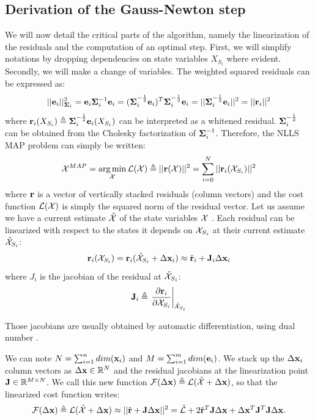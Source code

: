 \subsection{Derivation of the Gauss-Newton step}
We will now detail the critical parts of the algorithm, namely the linearization of the residuals and the computation of an optimal step.
First, we will simplify notations by dropping dependencies on state variables $X_{S_i}$ where evident. 
Secondly, we will make a change of variables. The weighted squared residuals can be expressed as:
%
\begin{equation}
    ||{\bf e}_i||^2_{{\bm \Sigma}_i} = {\bf e}_i {\bm \Sigma}_i^{-1} {\bf e}_i 
    = ({\bm \Sigma}_i^{-\frac{1}{2}}{\bf e}_i)^T{\bm \Sigma}_i^{-\frac{1}{2}}{\bf e}_i
    = ||{\bm \Sigma}_i^{-\frac{1}{2}}{\bf e}_i||^2 = ||{\bf r}_i||^2
\end{equation}
%
where ${\bf r}_i(X_{S_i}) \triangleq {\bm \Sigma}_i^{-\frac{1}{2}}{\bf e}_i(X_{S_i})$ can be interpreted as a whitened residual. ${\bm \Sigma}_i^{-\frac{1}{2}}$ can be obtained
from the Cholesky factorization of ${\bm \Sigma}_i^{-1}$. Therefore, the NLLS MAP problem can simply be written:
%
\begin{equation}
    \mathcal{X}^{MAP} = \operatorname*{arg\,min}_{\mathcal{X}} \mathcal{L}(\mathcal{X}) \triangleq||{\bf r}(\mathcal{X})||^2 = \sum_{i=0}^N ||{\bf r}_i({\mathcal{X}_{S_i}})||^2 
\end{equation}
%
where ${\bf r}$ is a vector of vertically stacked residuals (column vectors) and the cost function $\mathcal{L}(\mathcal{X})$ is simply the squared norm 
of the residual vector. Let us assume we have a current estimate $\check{\mathcal{X}}$ of the state variables $\mathcal{X}$ .
Each residual can be linearized with respect to the states it depends on $\mathcal{X}_{S_i}$ at their current estimate $\check{\mathcal{X}}_{S_i}$:
%
\begin{equation}
    {\bf r}_i(\mathcal{X}_{S_i}) = {\bf r}_i(\check{\mathcal{X}}_{S_i} + \Delta {\bf x}_i) \approx \check{{\bf r}}_i + {\bf J}_i \Delta {\bf x}_i
\end{equation}
%
where $J_i$ is the jacobian of the residual at $\check{\mathcal{X}}_{S_i}$: 
%
\begin{equation}
    {\bf J}_i \triangleq \left.\frac{\partial {\bf r}_i}{\partial \mathcal{X}_{S_i}}\right|_{\check{\mathcal{X}}_{S_i}}
    \label{eq:res_jacobian}
\end{equation}

Those jacobians are usually obtained by automatic differentiation, \eg using dual number \cite{ceres-solver}. 

We can note $N = \sum_{i=1}^{n}dim({\bf x}_i)$ and $M = \sum_{i=1}^{m}dim({\bf e}_i)$.
We stack up the $\Delta {\bf x}_i$ column vectors as $\Delta {\bf x} \in \mathbb{R}^N$ and the residual jacobians at the linearization point 
${\bf J} \in \mathbb{R}^{M \times N}$. We call this new function $\mathcal{F}(\Delta {\bf x}) \triangleq \mathcal{L}(\check{\mathcal{X}} + \Delta {\bf x})$, so that the linearized cost function writes:  
%
\begin{equation}
    \mathcal{F}(\Delta {\bf x}) \triangleq \mathcal{L}(\check{\mathcal{X}} + \Delta {\bf x}) 
    \approx ||\check{{\bf r}} + {\bf J} \Delta {\bf x}||^2 
    = \check{\mathcal{L}} +  2\check{{\bf r}}^T {\bf J} \Delta {\bf x} + \Delta {\bf x}^T {\bf J}^T {\bf J} \Delta {\bf x}.
\end{equation}

